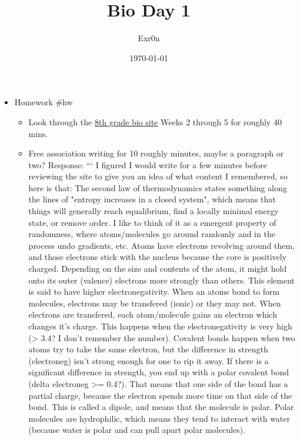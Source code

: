\documentclass[letterpaper]{article}
\author{Exr0n}
\date{\today}
\title{Bio Day 1}
\renewcommand\maketitle{}
\begin{document}
\maketitle
\begin{itemize}
\item Homework \#hw

\begin{itemize}
\item Look through the
\href{https://nuevaschool.instructure.com/courses/3017/assignments/50846}{8th
grade bio site} Weeks 2 through 5 for roughly 40 mins.
\item Free association writing for 10 roughly minutes, maybe a paragraph
or two? Response: ``` I figured I would write for a few minutes
before reviewing the site to give you an idea of what content I
remembered, so here is that: The second law of thermodynamics states
something along the lines of "entropy increases in a closed system",
which means that things will generally reach equalibrium, find a
locally minimal energy state, or remove order. I like to think of it
as a emergent property of randomness, where atoms/molecules go
around randomly and in the process undo gradients, etc. Atoms have
electrons revolving around them, and those electrons stick with the
nucleus because the core is positively charged. Depending on the
size and contents of the atom, it might hold onto its outer
(valence) electrons more strongly than others. This element is said
to have higher electronegativity. When an atoms bond to form
molecules, electrons may be transfered (ionic) or they may not. When
electrons are transfered, each atom/molecule gains an electron which
changes it's charge. This happens when the electronegativity is very
high (> 3.4? I don't remember the number). Covalent bonds happen
when two atoms try to take the same electron, but the difference in
strength (electroneg) isn't strong enough for one to rip it away. If
there is a significant difference in strength, you end up with a
polar covalent bond (delta electroneg >= 0.4?). That means that one
side of the bond has a partial charge, because the electron spends
more time on that side of the bond. This is called a dipole, and
means that the molecule is polar. Polar molecules are hydrophilic,
which means they tend to interact with water (because water is polar
and can pull apart polar molecules).
\end{itemize}
\end{itemize}
\end{document}
